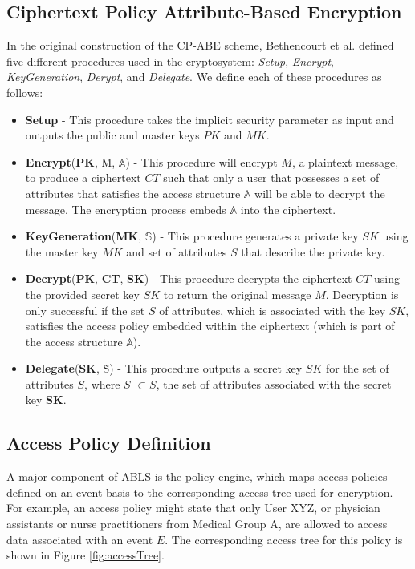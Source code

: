 \documentclass{sig-alternate}
\begin{document}
\subsection{Ciphertext Policy Attribute-Based Encryption}
In the original construction of the CP-ABE scheme, Bethencourt et al. \cite{Bethencourt2007-CPABE} defined five different procedures 
used in the cryptosystem: \emph{Setup}, \emph{Encrypt}, \emph{KeyGeneration}, \emph{Derypt}, and 
\emph{Delegate}. We define each of these procedures as follows:
\begin{itemize}
	\item \textbf{Setup} - This procedure takes the implicit security parameter as input and outputs the public and master keys $PK$ and $MK$.
	\item \textbf{Encrypt}(\textbf{PK}, M, $\mathbb{A}$) - This procedure will encrypt $M$, a plaintext message, to produce a ciphertext $CT$ such that only a user that possesses a set of attributes that satisfies the access structure $\mathbb{A}$ will be able to decrypt the message. The encryption process embeds $\mathbb{A}$ into the ciphertext.
	\item \textbf{KeyGeneration}(\textbf{MK}, $\mathbb{S}$) - This procedure generates a private key $SK$ using the master key $MK$ and set of attributes $S$ that describe the private key. 
	\item \textbf{Decrypt}(\textbf{PK}, \textbf{CT}, \textbf{SK}) - This procedure decrypts the ciphertext $CT$ using the provided secret key $SK$ to return the original message $M$. Decryption is only successful if the set $S$ of attributes, which is associated with the key $SK$, satisfies the access policy embedded within the ciphertext (which is part of the access structure $\mathbb{A}$).
	\item \textbf{Delegate}(\textbf{SK}, \~{S}) - This procedure outputs a secret key \~{$SK$} for the set of attributes \~{$S$}, where \~{$S$} $\subset S$, the set of attributes associated with the secret key \textbf{SK}.
\end{itemize}

\subsection{Access Policy Definition}

A major component of ABLS is the policy engine, which maps access policies defined on an event basis to 
the corresponding access tree used for encryption. For example, an access policy might state that only User
XYZ, or physician assistants or nurse practitioners from Medical Group A, are allowed to access data associated
with an event $E$. The corresponding access tree for this policy is shown in Figure \ref{fig:accessTree}.  
\end{document}

